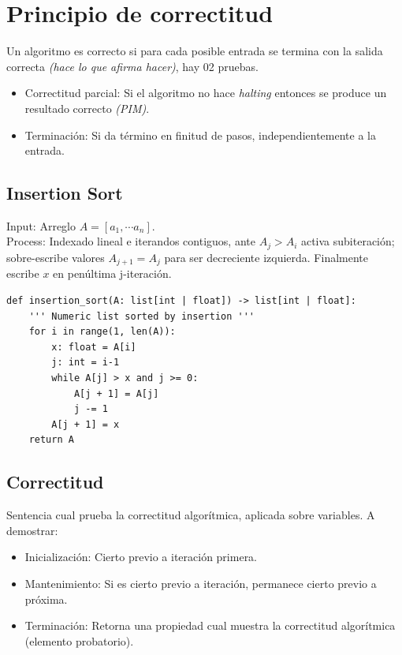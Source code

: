 \section{Principio de correctitud}
Un algoritmo es correcto si para cada posible entrada se termina con la salida correcta \textit{(hace lo que afirma hacer)}, hay 02 pruebas.


\begin{itemize}
	\item{Correctitud parcial}:
	      Si el algoritmo no hace \textit{halting} entonces se produce un resultado correcto \textit{(PIM)}.

	\item{Terminación}:
	      Si da término en finitud de pasos, independientemente a la entrada.
\end{itemize}



\subsection{Insertion Sort}
Input: Arreglo  $A = [a_1, \cdots a_n]$.
\\
Process: Indexado lineal e iterandos contiguos, ante $A_j > A_i$ activa subiteración; sobre-escribe valores $A_{j+1} = A_{j}$ para ser decreciente izquierda. Finalmente escribe $x$ en penúltima j-iteración.

\begin{lstlisting}
def insertion_sort(A: list[int | float]) -> list[int | float]:
    ''' Numeric list sorted by insertion '''
    for i in range(1, len(A)):
        x: float = A[i]
        j: int = i-1
        while A[j] > x and j >= 0:
            A[j + 1] = A[j]
            j -= 1
        A[j + 1] = x
    return A
\end{lstlisting}

\subsection{Correctitud}
\begin{definition}
	Sentencia cual prueba la correctitud algorítmica, aplicada sobre variables.
	A demostrar:
	\begin{itemize}
		\item Inicialización: Cierto previo a iteración primera.
		\item Mantenimiento: Si es cierto previo a iteración, permanece cierto previo a próxima.
		\item Terminación: Retorna una propiedad cual muestra la correctitud algorítmica (elemento probatorio).
	\end{itemize}
\end{definition}

